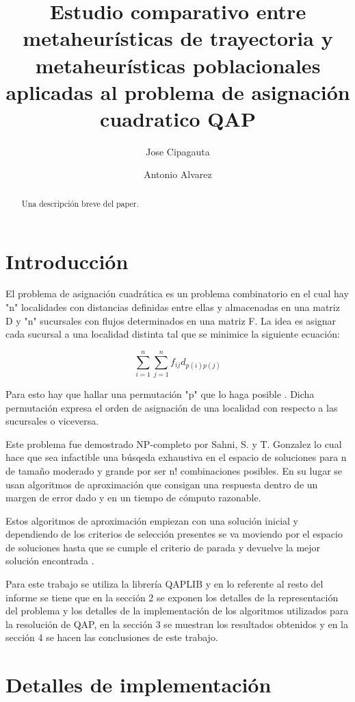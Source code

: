 \documentclass{ci5652}
\title{Estudio comparativo entre metaheurísticas de trayectoria y metaheurísticas poblacionales aplicadas al problema de asignación cuadratico QAP}
\author{Jose Cipagauta 
        \and
        Antonio Alvarez}
\begin{document}
\thispagestyle{empty}
\maketitle

\begin{abstract}
Una descripción breve del paper.
\end{abstract}

\section{Introducción}
El problema de asignación cuadrática es un problema combinatorio en el cual hay "n" localidades con distancias definidas entre ellas y almacenadas en una matriz D y "n" sucursales con flujos determinados en una matriz F. La idea es asignar cada sucursal a una localidad distinta tal que se minimice la siguiente ecuación: 

\begin {equation*}
\sum_{i=1}^{n} \sum_{j=1}^{n} f_{ij} d_{p(i)p(j)}
\end {equation*}

Para esto hay que hallar una permutación "p"  que lo haga posible \cite{1}. Dicha permutación expresa el orden de asignación de una localidad con respecto a las sucursales o viceversa.

Este problema fue demostrado NP-completo por Sahni, S. y T. Gonzalez \cite{2} lo cual hace que sea infactible una búsqeda exhaustiva en el espacio de soluciones para n de tamaño moderado y grande por ser n! combinaciones posibles. En su lugar se usan algoritmos de aproximación que consigan una respuesta dentro de un margen de error dado y en un tiempo de cómputo razonable.

Estos algoritmos de aproximación empiezan con una solución inicial y dependiendo de los criterios de selección presentes se va moviendo por el espacio de soluciones hasta que se cumple el criterio de parada y devuelve la mejor solución encontrada \cite{4}.

Para este trabajo se utiliza la librería QAPLIB \cite{5} y en lo referente al resto del informe se tiene que en la sección 2 se exponen los detalles de la representación del problema y los detalles de la implementación de los algoritmos utilizados para la resolución de QAP, en la sección 3 se muestran los resultados obtenidos y en la sección 4 se hacen las conclusiones de este trabajo. 

\section{Detalles de implementación}
\end{document}
